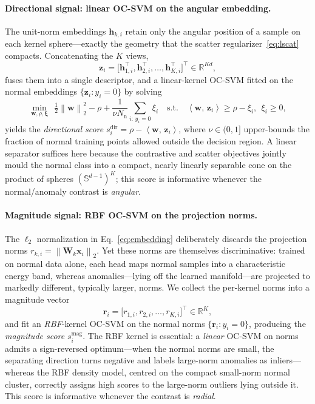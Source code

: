 \documentclass[preprint,12pt]{elsarticle}
\newcommand{\R}{\mathbb{R}}
\newcommand{\Sph}{\mathbb{S}}
\newcommand{\norm}[1]{\left\lVert #1 \right\rVert}
\newcommand{\inner}[2]{\left\langle #1,\, #2 \right\rangle}
\newcommand{\hh}{\bm{h}}
\newcommand{\zz}{\bm{z}}
\newcommand{\xx}{\bm{x}}
\newcommand{\ww}{\bm{w}}
\newcommand{\WW}{\bm{W}}
\begin{document}
\paragraph{Directional signal: linear OC-SVM on the angular embedding.}
The unit-norm embeddings $\hh_{k,i}$ retain only the angular position of a
sample on each kernel sphere---exactly the geometry that the scatter
regularizer~\eqref{eq:lscat} compacts. Concatenating the $K$ views,
\begin{equation}
\zz_i=\big[\hh_{1,i}^{\!\top},\hh_{2,i}^{\!\top},\dots,
\hh_{K,i}^{\!\top}\big]^{\!\top}\in\R^{Kd},
\label{eq:concat}
\end{equation}
fuses them into a single descriptor, and a linear-kernel OC-SVM fitted on the
normal embeddings $\{\zz_i : y_i=0\}$ by solving
\begin{equation}
\min_{\ww,\rho,\bm{\xi}}\ \
\tfrac{1}{2}\norm{\ww}_2^{2}-\rho
+\frac{1}{\nu N_{\mathrm{n}}}\sum_{i:\,y_i=0}\xi_i
\quad\text{s.t.}\quad
\inner{\ww}{\zz_i}\ge\rho-\xi_i,\ \ \xi_i\ge 0,
\label{eq:ocsvm}
\end{equation}
yields the \emph{directional score}
$s^{\mathrm{dir}}_i=\rho-\inner{\ww}{\zz_i}$, where $\nu\in(0,1]$ upper-bounds
the fraction of normal training points allowed outside the decision region. A
linear separator suffices here because the contrastive and scatter objectives
jointly mould the normal class into a compact, nearly linearly separable cone
on the product of spheres $(\Sph^{d-1})^{K}$; this score is informative
whenever the normal/anomaly contrast is \emph{angular}.

\paragraph{Magnitude signal: RBF OC-SVM on the projection norms.}
The $\ell_2$ normalization in Eq.~\eqref{eq:embedding} deliberately discards the
projection norms $r_{k,i}=\norm{\WW_k\xx_i}_2$. Yet these norms are themselves
discriminative: trained on normal data alone, each head maps normal samples into
a characteristic energy band, whereas anomalies---lying off the learned
manifold---are projected to markedly different, typically larger, norms. We
collect the per-kernel norms into a magnitude vector
\begin{equation}
\bm{r}_i=\big[r_{1,i},r_{2,i},\dots,r_{K,i}\big]^{\!\top}\in\R^{K},
\label{eq:rmag}
\end{equation}
and fit an \emph{RBF}-kernel OC-SVM on the normal norms $\{\bm{r}_i : y_i=0\}$,
producing the \emph{magnitude score} $s^{\mathrm{mag}}_i$. The RBF kernel is
essential: a \emph{linear} OC-SVM on norms admits a sign-reversed optimum---when
the normal norms are small, the separating direction turns negative and labels
large-norm anomalies as inliers---whereas the RBF density model, centred on the
compact small-norm normal cluster, correctly assigns high scores to the
large-norm outliers lying outside it. This score is informative whenever the
contrast is \emph{radial}.
\end{document}
